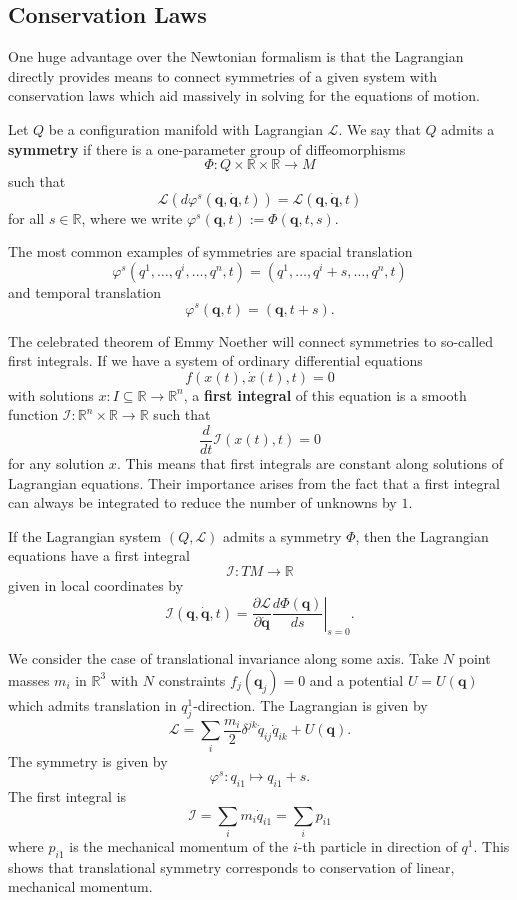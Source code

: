 \subsection*{Conservation Laws}
One huge advantage over the Newtonian formalism is that the Lagrangian directly provides means to connect symmetries of a given system with conservation laws which aid massively in solving for the equations of motion.
\begin{definition}[Symmetry]
    Let $Q$ be a configuration manifold with Lagrangian $\mathcal{L}$. We say that $Q$ admits a \textbf{symmetry} if there is a one-parameter group of diffeomorphisms \[
    \Phi: Q \times  \mathbb{R} \times \mathbb{R} \to M
    \] such that \[
    \mathcal{L}(d\varphi^s (\mathbf{q}, \dot{\mathbf{q}},t))=\mathcal{L}(\mathbf{q},\dot{\mathbf{q}},t)
    \] for all $s \in \mathbb{R}$,
    where we write $\varphi^s(\mathbf{q},t):=\Phi(\mathbf{q},t,s)$.  
\end{definition}
\begin{eg}
    The most common examples of symmetries are spacial translation \[
    \varphi^s(q^1,\dots, q^i, \dots,q^n,t)=(q^1, \dots, q^i+s, \dots, q^n,t)
    \] and temporal translation
    \[
    \varphi^s(\mathbf{q},t)=(\mathbf{q},t+s)
    .\] 
\end{eg}
The celebrated theorem of Emmy Noether will connect symmetries to so-called first integrals. If we have a system of ordinary differential equations
\[
    f(x(t),\dot{x}(t),t)=0
\] with solutions $x: I \subseteq \mathbb{R} \to \mathbb{R}^n$, a \textbf{first integral} of this equation is a smooth function $\mathcal{I}: \mathbb{R}^n \times \mathbb{R} \to \mathbb{R}$ such that
\[
\frac{d}{dt}\mathcal{I}(x(t),t)=0
\] for any solution $x$. This means that first integrals are constant along solutions of Lagrangian equations. Their importance arises from the fact that a first integral can always be integrated to reduce the number of unknowns by $1$. 
\begin{theorem}[Noether]
    If the Lagrangian system $(Q,\mathcal{L})$ admits a symmetry $\Phi$, then the Lagrangian equations have a first integral \[
    \mathcal{I}: TM \to \mathbb{R}
    \] given in local coordinates by \[
    \mathcal{I}(\mathbf{q}, \dot{\mathbf{q}},t)=\frac{\partial \mathcal{L}}{\partial \dot{\mathbf{q}}} \left. \frac{d \Phi(\mathbf{q})}{ds} \right|_{s=0}
    .\] 
\end{theorem}
\begin{eg}
    We consider the case of translational invariance along some axis. Take $N$ point masses $m_i$ in $\mathbb{R}^3$ with $N$ constraints $f_j(\mathbf{q}_j)=0$ and a potential $U=U(\mathbf{q})$ which admits translation in $q_j^1$-direction. The Lagrangian is given by
    \[
        \mathcal{L}=\sum_i \frac{m_i}{2} \delta^{jk} \dot{q}_{ij} \dot{q}_{ik} + U(\mathbf{q})
    .\] The symmetry is given by
    \[
        \varphi^s: q_{i1} \mapsto q_{i1} + s
    .\] The first integral is
    \[
        \mathcal{I}=\sum_i m_i \dot{q}_{i1} = \sum_i p_{i1}
    \] where $p_{i1}$ is the mechanical momentum of the $i$-th particle in direction of $q^1$. This shows that translational symmetry corresponds to conservation of linear, mechanical momentum.
\end{eg}
